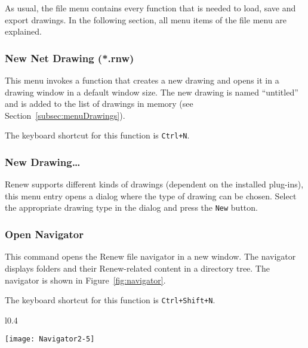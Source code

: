 As usual, the file menu contains every function that is needed
to load, save and export drawings.
In the following section, all menu items of the file menu are
explained.

\subsubsection{New Net Drawing (*.rnw)}

This menu invokes a function that creates a new drawing and
opens it in a drawing window in a default window size.
The new drawing is named ``untitled'' and is added to the
list of drawings in memory (see Section~\ref{subsec:menuDrawings}).

The keyboard shortcut for this function is \texttt{Ctrl+N}.

\subsubsection{New Drawing\dots}

Renew supports different kinds of
drawings (dependent on the installed plug-ins), this menu entry
opens a dialog where the type of drawing can be chosen. 
Select the appropriate drawing type in the dialog and press the
\texttt{New} button.

\subsubsection{Open Navigator}
\label{sec:navigator}

This command opens the Renew file navigator in a new window.
The navigator displays folders and their Renew-related content in a
directory tree. The navigator is shown in Figure~\ref{fig:navigator}.

The keyboard shortcut for this function is \texttt{Ctrl+Shift+N}.


\begin{wrapfigure}{l}{0.4\textwidth}
  \begin{center}
    \texttt{[image: Navigator2-5]}
      \vspace{-30pt} %
  \end{center}
  \caption{The Renew Navigator}
  \label{fig:navigator}
\end{wrapfigure}


